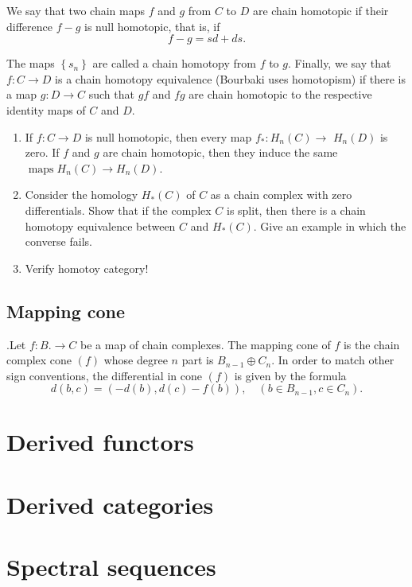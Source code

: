 We say that two chain maps $f$ and $g$ from $C$ to $D$ are chain homotopic if their difference $f-g$ is null homotopic, that is, if
      $$
      f-g=s d+d s .
      $$
      
      The maps $\left\{s_n\right\}$ are called a chain homotopy from $f$ to $g$. Finally, we say that $f: C \rightarrow D$ is a chain homotopy equivalence (Bourbaki uses homotopism) if there is a map $g: D \rightarrow C$ such that $g f$ and $f g$ are chain homotopic to the respective identity maps of $C$ and $D$.

\begin{prop}
    \begin{enumerate}
        \item If $f: C \rightarrow D$ is null homotopic, then every map $f_*: H_n(C) \rightarrow$ $H_n(D)$ is zero. If $f$ and $g$ are chain homotopic, then they induce the same $\operatorname{maps} H_n(C) \rightarrow H_n(D)$.
        \item Consider the homology $H_*(C)$ of $C$ as a chain complex with zero differentials. Show that if the complex $C$ is split, then there is a chain homotopy equivalence between $C$ and $H_*(C)$. Give an example in which the converse fails.
        \item Verify homotoy category!
    \end{enumerate}
\end{prop}

\subsection*{Mapping cone}
.Let $f: B . \rightarrow C$ be a map of chain complexes. The mapping cone of $f$ is the chain complex cone $(f)$ whose degree $n$ part is $B_{n-1} \oplus C_n$. In order to match other sign conventions, the differential in cone $(f)$ is given by the formula
$$
d(b, c)=(-d(b), d(c)-f(b)), \quad\left(b \in B_{n-1}, c \in C_n\right) .
$$


\section{Derived functors}


\section{Derived categories}


\section{Spectral sequences}

